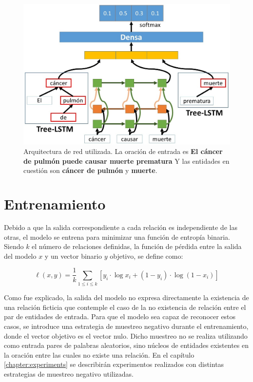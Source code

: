 \begin{figure}[h!]
	\centering
	\includegraphics[width=1\linewidth]{Graphics/rel_model_class.jpg}
	\caption{Arquitectura de red utilizada. La oración de entrada es \textbf{El cáncer de pulmón puede causar muerte prematura} Y las entidades en cuestión son \textbf{cáncer de pulmón} y \textbf{muerte}.}\label{fig:rel_model}
\end{figure}

\section{Entrenamiento}

Debido a que la salida correspondiente a cada relación es independiente de las otras, el modelo se entrena para minimizar una función de entropía binaria.
Siendo $k$ el número de relaciones definidas, la función de pérdida entre la salida del modelo $x$ y un vector binario $y$ objetivo, se define como:

\begin{equation*}
	\ell(x, y) = \frac{1}{k}\sum_{1\leq i\leq k}{\left[ y_i \cdot \log x_i + (1 - y_i) \cdot \log (1 - x_i) \right]}
\end{equation*}

Como fue explicado, la salida del modelo no expresa directamente la existencia de una relación ficticia que contemple el caso de la no existencia de relación entre el par de entidades de entrada.
Para que el modelo sea capaz de reconocer estos casos, se introduce una estrategia de muestreo negativo durante el entrenamiento, donde el vector objetivo es el vector nulo.
Dicho muestreo no se realiza utilizando como entrada pares de palabras aleatorios, sino núcleos de entidades existentes en la oración entre las cuales no existe una relación.
En el capítulo \ref{chapter:experiments} se describirán experimentos realizados con distintas estrategias de muestreo negativo utilizadas.

